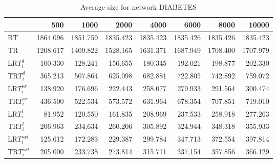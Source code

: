 \begin{table}
\begin{center}
\begin{tabular}{lrrrrrrr}
 & 500 & 1000 & 2000 & 4000 & 6000 & 8000 & 10000\\\hline
BT & 1864.096 & 1851.759 & 1835.423 & 1835.423 & 1835.426 & 1835.426 & 1835.423\\\hline
TR & 1208.617 & 1409.822 & 1528.165 & 1631.371 & 1687.949 & 1708.400 & 1707.979\\\hline
LR$T_i^d$ & 100.330 & 128.241 & 156.655 & 180.345 & 192.021 & 198.877 & 202.330\\\hline
TR$T_i^d$ & 365.213 & 507.864 & 625.098 & 682.881 & 722.805 & 742.892 & 759.072\\\hline
LR$T_i^{sx}$ & 138.920 & 176.696 & 222.443 & 258.077 & 279.933 & 291.564 & 300.474\\\hline
TR$T_i^{sx}$ & 436.500 & 522.534 & 573.572 & 631.964 & 678.354 & 707.851 & 719.010\\\hline
LR$T_i^l$ & 81.952 & 120.550 & 161.835 & 208.969 & 237.533 & 258.918 & 277.263\\\hline
TR$T_i^l$ & 206.963 & 234.634 & 260.206 & 305.892 & 324.944 & 348.318 & 355.933\\\hline
LR$T_i^{sxl}$ & 125.612 & 172.283 & 229.387 & 299.784 & 347.713 & 372.554 & 397.814\\\hline
TR$T_i^{sxl}$ & 205.000 & 233.738 & 273.814 & 315.711 & 337.154 & 357.856 & 366.129\\\hline
\end{tabular}
\end{center}
\caption{Average size for network DIABETES }
\label{Diabetessi}
\end{table}

